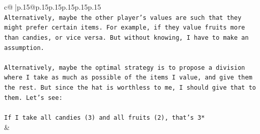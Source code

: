 \documentclass{article}
\begin{document}
{\begin{supertabular}{c@{$\;$}|p{.15\linewidth}@{}p{.15\linewidth}p{.15\linewidth}p{.15\linewidth}p{.15\linewidth}p{.15\linewidth}}
{{{\\ 
\texttt{Alternatively, maybe the other player's values are such that they might prefer certain items. For example, if they value fruits more than candies, or vice versa. But without knowing, I have to make an assumption.} \\
\\ 
\texttt{Alternatively, maybe the optimal strategy is to propose a division where I take as much as possible of the items I value, and give them the rest. But since the hat is worthless to me, I should give that to them. Let's see:} \\
\\ 
\texttt{If I take all candies (3) and all fruits (2), that's 3*} \\
            }
        }
    }
    & \\ \\


\end{supertabular}}
\end{document}
